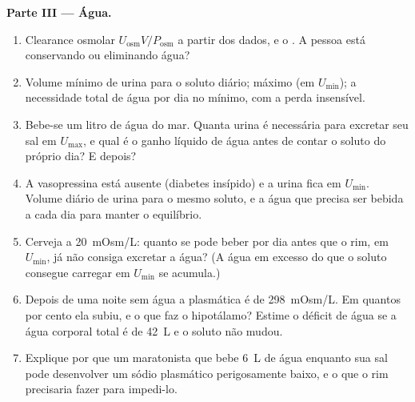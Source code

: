\begin{problem}
\medskip
\noindent\textbf{Parte III --- Água.}
\begin{enumerate}[resume]
  \item Clearance osmolar $U_{\text{osm}}V/P_{\text{osm}}$ a partir dos
        dados, e o . A pessoa está conservando ou
        eliminando água?
  \item Volume mínimo de urina para o soluto diário; máximo (em
        $U_{\min}$); a necessidade total de água por dia no mínimo, com
        a perda insensível.
  \item Bebe-se um litro de água do mar. Quanta urina é necessária para
        excretar seu sal em $U_{\max}$, e qual é o ganho líquido de água
        antes de contar o soluto do próprio dia? E depois?
  \item A vasopressina está ausente (diabetes insípido) e a urina fica em
        $U_{\min}$. Volume diário de urina para o mesmo soluto, e a água
        que precisa ser bebida a cada dia para manter o equilíbrio.
  \item Cerveja a \qty{20}{mOsm/L}: quanto se pode beber por dia antes
        que o rim, em $U_{\min}$, já não consiga excretar a água? (A água
        em excesso do que o soluto consegue carregar em $U_{\min}$ se
        acumula.)
  \item Depois de uma noite sem água a  plasmática é de
        \qty{298}{mOsm/L}. Em quantos por cento ela subiu, e o que faz o
        hipotálamo? Estime o déficit de água se a água corporal total é
        de \qty{42}{L} e o soluto não mudou.
  \item Explique por que um maratonista que bebe \qty{6}{L} de água
        enquanto sua sal pode desenvolver um sódio plasmático
        perigosamente baixo, e o que o rim precisaria fazer para
        impedi-lo.
\end{enumerate}


\end{problem}
